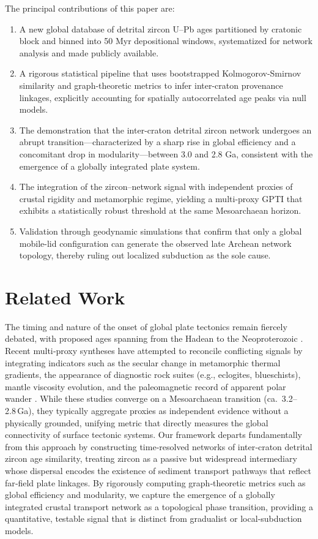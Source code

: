 \documentclass{article}
\begin{document}
The principal contributions of this paper are:
\begin{enumerate}
    \item A new global database of detrital zircon U–Pb ages partitioned by cratonic block and binned into 50 Myr depositional windows, systematized for network analysis and made publicly available.
    \item A rigorous statistical pipeline that uses bootstrapped Kolmogorov-Smirnov similarity and graph-theoretic metrics to infer inter-craton provenance linkages, explicitly accounting for spatially autocorrelated age peaks via null models.
    \item The demonstration that the inter-craton detrital zircon network undergoes an abrupt transition—characterized by a sharp rise in global efficiency and a concomitant drop in modularity—between 3.0 and 2.8 Ga, consistent with the emergence of a globally integrated plate system.
    \item The integration of the zircon–network signal with independent proxies of crustal rigidity and metamorphic regime, yielding a multi-proxy GPTI that exhibits a statistically robust threshold at the same Mesoarchaean horizon.
    \item Validation through geodynamic simulations that confirm that only a global mobile-lid configuration can generate the observed late Archean network topology, thereby ruling out localized subduction as the sole cause.
\end{enumerate}

\section{Related Work}

The timing and nature of the onset of global plate tectonics remain fiercely debated, with proposed ages spanning from the Hadean to the Neoproterozoic \cite{stern_plate_tectonics_onset2005, harrison_hadean_2009, cawood_plate_tectonics_review2022}. Recent multi‑proxy syntheses have attempted to reconcile conflicting signals by integrating indicators such as the secular change in metamorphic thermal gradients, the appearance of diagnostic rock suites (e.g., eclogites, blueschists), mantle viscosity evolution, and the paleomagnetic record of apparent polar wander \cite{brown_metamorphic_imprints2020, holder_global_proxies2019, keller_statistical_onset2017}. While these studies converge on a Mesoarchaean transition (ca.\ 3.2–2.8 Ga), they typically aggregate proxies as independent evidence without a physically grounded, unifying metric that directly measures the global connectivity of surface tectonic systems. Our framework departs fundamentally from this approach by constructing time‑resolved networks of inter‑craton detrital zircon age similarity, treating zircon as a passive but widespread intermediary whose dispersal encodes the existence of sediment transport pathways that reflect far‑field plate linkages. By rigorously computing graph‑theoretic metrics such as global efficiency and modularity, we capture the emergence of a globally integrated crustal transport network as a topological phase transition, providing a quantitative, testable signal that is distinct from gradualist or local‑subduction models.
\end{document}
